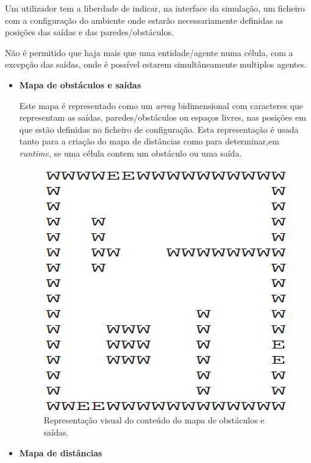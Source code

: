 \documentclass[12pt]{article}
\begin{document}
\begin{titlepage}
\begin{itemize}
Um utilizador tem a liberdade de indicar, na interface da simulação, um ficheiro com a configuração do ambiente onde estarão necessariamente definidas as posições das saídas e das paredes/obstáculos.

Não é permitido que haja mais que uma entidade/agente numa célula, com a excepção das saídas, onde é possível estarem simultâneamente multiplos agentes.

\begin{itemize}

\item \textbf{Mapa de obstáculos e saídas}

Este mapa é representado como um \textit{array} bidimensional com caracteres que representam as saídas, paredes/obstáculos ou espaços livres, nas posições em que estão definidas no ficheiro de configuração. Esta representação é usada tanto para a criação do mapa de distâncias como para determinar,em \textit{runtime}, se uma célula contem um obstáculo ou uma saída.

\begin{figure}[H]
	\centering
	\includegraphics[scale=0.2]{map_text.png}
	\caption{Representação visual do conteúdo do mapa de obstáculos e saídas.}
	\label{map}
\end{figure}

\item \textbf{Mapa de distâncias}


\end{itemize}
\end{itemize}
\end{titlepage}
\end{document}
